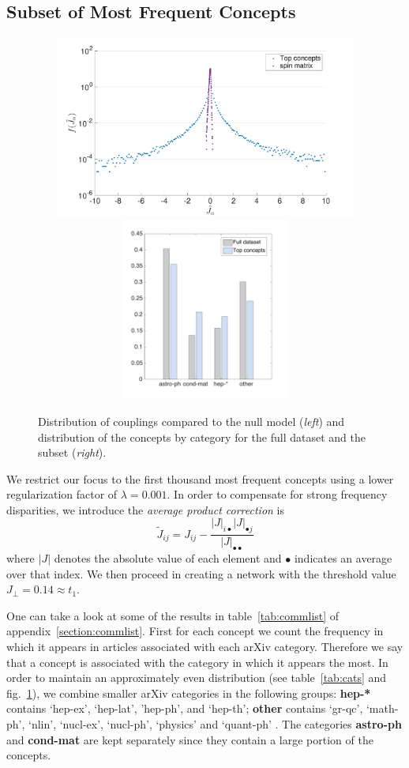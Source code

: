 \documentclass[a4paper,12pt,twoside]{article}
\def \be {\begin{equation}}
\def \ee {\end{equation}}
\def \bf {\textbf}
\begin{document}
\subsection{Subset of Most Frequent Concepts}
\begin{figure}
  \centerline{
    \includegraphics[height=6cm,width=1\textwidth,keepaspectratio]{../img/distribution_comparison_top.pdf}
    \includegraphics[height=6cm,width=1\textwidth,keepaspectratio]{../img/comparison_top_total.pdf}
  }
  \caption{Distribution of couplings compared to the null model ({\em left}) and  distribution of the concepts by category for the full dataset and the subset ({\em right}).}
  \label{fig:topc}
\end{figure}

We restrict our focus to the first thousand most frequent concepts using a lower regularization factor of $\lambda = 0.001$.
In order to compensate for strong frequency disparities, we introduce the {\em average product correction} is
\be
  \tilde{J}_{ij} = J_{ij} - \frac{|J|_{i \bullet } |J|_{\bullet j}}{|J|_{\bullet \bullet }}
\ee 
where $|J|$ denotes the absolute value of each element and $\bullet$ indicates an average over that index. We then proceed in creating a network with the threshold value $J_\bot = 0.14 \approx t_1$.

One can take a look at some of the results in table~\ref{tab:commlist} of appendix~\ref{section:commlist}.
First for each concept we count the frequency in which it appears in articles associated with each arXiv category.
Therefore we say that a concept is associated  with the category in which it appears the most.
In order to maintain an approximately even  distribution (see table~\ref{tab:cats} and fig.~\ref{fig:topc}), we combine smaller arXiv categories in the following groups:  \bf{hep-*} contains `hep-ex', `hep-lat', 'hep-ph', and `hep-th'; \bf{other} contains `gr-qc', `math-ph', `nlin', `nucl-ex', `nucl-ph', `physics' and `quant-ph' . The categories \bf{astro-ph} and \bf{cond-mat} are kept separately since they contain a large portion of the concepts.
\end{document}
